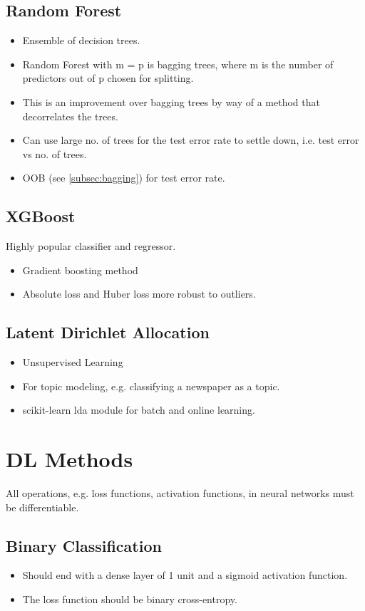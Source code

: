 \documentclass[a4paper, 12pt]{report}
\begin{document}
\section{Random Forest}
\begin{itemize}
\item Ensemble of decision trees.
\item Random Forest with m = p is bagging trees, where m is the number of predictors out of p chosen for splitting.
\item This is an improvement over bagging trees by way of a method that decorrelates the trees.
\item Can use large no. of trees for the test error rate to settle down, i.e. test error vs no. of trees.
\item OOB (see  \autoref{subsec:bagging}) for test error rate.
\end{itemize}

\section{XGBoost}
Highly popular classifier and regressor. 
\begin{itemize}
\item Gradient boosting method
\item Absolute loss and Huber loss more robust to outliers.
\end{itemize}

\section{Latent Dirichlet Allocation}
\begin{itemize}
\item Unsupervised Learning
\item For topic modeling, e.g. classifying a newspaper as a topic.
\item {\color{cyan}scikit-learn lda module} for batch and online learning.
\end{itemize}

\chapter{DL Methods}
All operations, e.g. loss functions, activation functions, in neural networks must be differentiable.

\section{Binary Classification}
\begin{itemize}
\item Should end with a dense layer of 1 unit and a sigmoid activation function.
\item The loss function should be binary cross-entropy.
\end{itemize}
\end{document}
